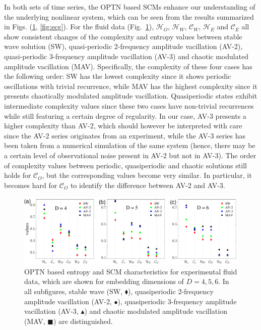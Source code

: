 \documentclass[aip,cha,reprint,nofootinbib]{revtex4-1}
\begin{document}
In both sets of time series, the OPTN based SCMs enhance our understanding of the underlying nonlinear system, which can be seen from the results summarized in Figs. (\ref{fig:fluid}, \ref{fig:ecg}). For the fluid data (Fig.~\ref{fig:fluid}), $\mathcal{H}_O$, $\mathcal{H}_W$, $\mathcal{C}_W$, $\mathcal{H}_E$ and $\mathcal{C}_E$ all show consistent changes of the complexity and entropy values between stable wave solution (SW), quasi-periodic 2-frequency amplitude vacillation (AV-2), quasi-periodic 3-frequency amplitude vacillation (AV-3) and chaotic modulated amplitude vacillation (MAV). Specifically, the complexity of these four cases has the following order: SW has the lowest complexity since it shows periodic oscillations with trivial recurrence, while MAV has the highest complexity since it presents chaotically modulated amplitude vacillation. Quasiperiodic states exhibit intermediate complexity values since these two cases have non-trivial recurrences while still featuring a certain degree of regularity. In our case, AV-3 presents a higher complexity than AV-2, which should however be interpreted with care since the AV-2 series originates from an experiment, while the AV-3 series has been taken from a numerical simulation of the same system (hence, there may be a certain level of observational noise present in AV-2 but not in AV-3). The order of complexity values between periodic, quasiperiodic and chaotic solutions still holds for $\mathcal{C}_O$, but the corresponding values become very similar. In particular, it becomes hard for $\mathcal{C}_O$ to identify the difference between AV-2 and AV-3. 
\begin{figure}
	\centering 
	\includegraphics[width=2\columnwidth]{fluidExample.pdf}
\caption{\color{red}\small{OPTN based entropy and SCM characteristics for experimental fluid data, which are shown for embedding dimensions of $D = 4, 5, 6$. In all subfigures, stable wave (SW, $\blacklozenge$), quasiperiodic 2-frequency amplitude vacillation (AV-2, $\bullet$), quasiperiodic 3-frequency amplitude vacillation (AV-3, $\blacktriangle$) and chaotic modulated amplitude vacillation (MAV, $\blacksquare$) are distinguished. } \label{fig:fluid}}
\end{figure}
\end{document}
